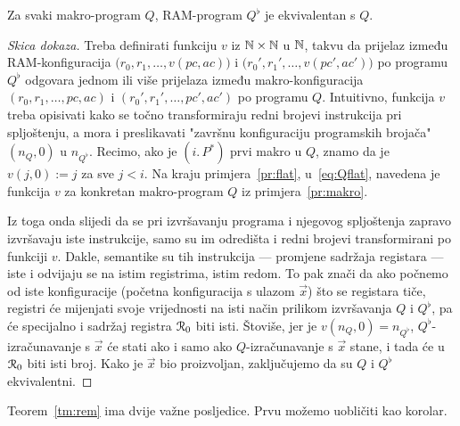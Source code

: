 \begin{teorem}[{name=[ekvivalentnost programa i njegovog spljoštenja]}]\label{tm:rem}
Za svaki makro-program $Q$, RAM-program $Q^\flat$ je ekvivalentan s $Q$.
\end{teorem}
\begin{proof}[Skica dokaza]
Treba definirati funkciju $v$ iz ${\mathbb N}\times{\mathbb N}$ u ${\mathbb N}$, takvu da prijelaz između RAM-konfiguracija $\bigl(r_0,r_1,\dotsc,v(pc,ac)\bigr)$ i $\bigl(r_0',r_1',\dotsc,v(pc',ac')\bigr)$ po programu $Q^\flat$ odgovara jednom ili više prijelaza između makro-konfiguracija $(r_0,r_1,\dotsc,pc,ac)$ i $(r_0',r_1',\dotsc,pc',ac')$ po programu $Q$. Intuitivno, funkcija $v$ treba opisivati kako se točno transformiraju redni brojevi instrukcija pri spljoštenju, a mora i preslikavati "završnu konfiguraciju programskih brojača" $(n_Q,0)$ u $n_{Q^\flat}$. Recimo, ako je $(i.\,P^*)$ prvi makro u $Q$, znamo da je $v(j,0):=j$ za sve $j<i$. Na kraju primjera~\ref{pr:flat}, u~\eqref{eq:Qflat}, navedena je funkcija $v$ za konkretan makro-program $Q$ iz primjera~\ref{pr:makro}.

Iz toga onda slijedi da se pri izvršavanju programa i njegovog spljoštenja zapravo izvršavaju iste instrukcije, samo su im odredišta i redni brojevi transformirani po funkciji $v$. Dakle, semantike su tih instrukcija --- promjene sadržaja registara --- iste i odvijaju se na istim registrima, istim redom. To pak znači da ako počnemo od iste konfiguracije (početna konfiguracija s ulazom $\vec x$) što se registara tiče, registri će mijenjati svoje vrijednosti na isti način prilikom izvršavanja $Q$ i $Q^\flat$, pa će specijalno i sadržaj registra $\mathcal R_{0}$ biti isti. Štoviše, jer je $v(n_Q,0)=n_{Q^\flat}$, $Q^\flat$-izračunavanje s $\vec x$ će stati ako i samo ako $Q$-izračunavanje s $\vec x$ stane, i tada će u $\mathcal R_{0}$ biti isti broj. Kako je $\vec x$ bio proizvoljan, zaključujemo da su $Q$ i $Q^\flat$ ekvivalentni.
\end{proof}

Teorem~\ref{tm:rem} ima dvije važne posljedice. Prvu možemo uobličiti kao korolar.

